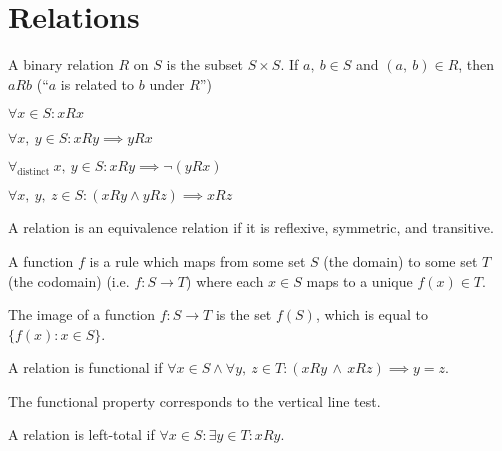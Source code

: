 \documentclass{article}
\begin{document}
\section{Relations}
\begin{definition}
    A binary relation \(R\) on \(S\) is the subset \(S\times S\).
    If \(a, \: b \in S\) and  \((a, \: b) \in R\),
    then \(aRb\) (``\(a\) is related to \(b\) under \(R\)'')
\end{definition}
%
\begin{tcolorboxlarge}[title={Relation Properties}]
    \begin{description}[style=sameline]
        \item[Reflexive]
            \(\forall x \in S : xRx\)
        \item[Symmetric]
            \(\forall x,\: y \in S : xRy \implies yRx\)
        \item[Antisymmetric]
            \(\forall_\text{distinct} \: x,\: y \in S : xRy \implies \neg (yRx)\)
        \item[Transitive]
            \(\forall x,\: y, \: z \in S : (xRy \land yRz) \implies xRz\)
    \end{description}
    \begin{definition}
        A relation is an equivalence relation if it is
        reflexive, symmetric, and transitive.
    \end{definition}
\end{tcolorboxlarge}
%
\begin{definition}
    A function \(f\) is a rule which maps
    from some set \(S\) (the domain)
    to some set \(T\) (the codomain)
    (i.e. \(f: S \to T\)) where each \(x \in S\) maps to a unique \(f(x) \in T\).
\end{definition}
\begin{definition}[Image]
    The image of a function \(f: S \to T\) is the set \(f(S)\),
    which is equal to \(\{f(x):x \in S\}\).
\end{definition}
\begin{definition}[Functional]
    A relation is functional if
    \(\forall x \in S \land \forall y,\: z \in T
    : (xRy \, \land \, xRz) \implies y=z\).
\end{definition}
\begin{note}
    The functional property corresponds to the vertical line test.
\end{note}
\begin{definition}
    A relation is left-total if
    \(\forall x \in S : \exists y \in T : xRy\).
\end{definition}
\end{document}
